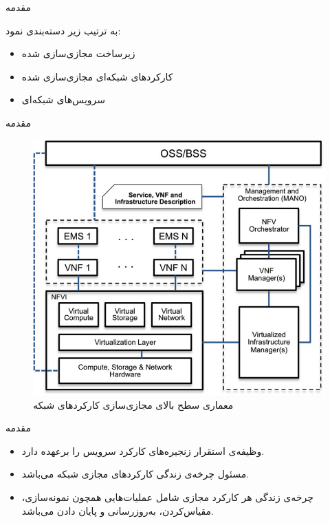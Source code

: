 \documentclass{beamer}
\makeatletter
\newcommand{\RTList}{\raggedleft\rightskip\@totalleftmargin}
\makeatother
\begin{document}
\begin{persian}
\begin{frame}{مقدمه}
\begin{itemize}
        به ترتیب زیر دسته‌بندی نمود:
        \begin{itemize}\RTList{}
            \item زیرساخت مجازی‌سازی شده
            \item کارکردهای شبکه‌ای مجازی‌سازی شده
            \item سرویس‌های شبکه‌ای
        \end{itemize}
    \end{itemize}
\end{frame}
\begin{frame}{مقدمه} %
    \begin{center}\begin{figure}
        \includegraphics[scale=0.4]{images/nfv-arch.png}
        \caption{معماری سطح بالای مجازی‌سازی کارکردهای شبکه}
    \end{figure}\end{center}
\end{frame}
\begin{frame}{مقدمه} %
    \begin{itemize}\RTList{}
        \item {} وظیفه‌ی استقرار زنجیره‌های کارکرد سرویس را برعهده دارد.
        \item {} مسئول چرخه‌ی زندگی کارکردهای مجازی شبکه می‌باشد.
        \item چرخه‌ی زندگی هر کارکرد مجازی شامل عملیات‌هایی همچون نمونه‌سازی، مقیاس‌کردن، به‌روزرسانی و پایان دادن می‌باشد.

\end{itemize}
\end{frame}
\end{persian}
\end{document}
